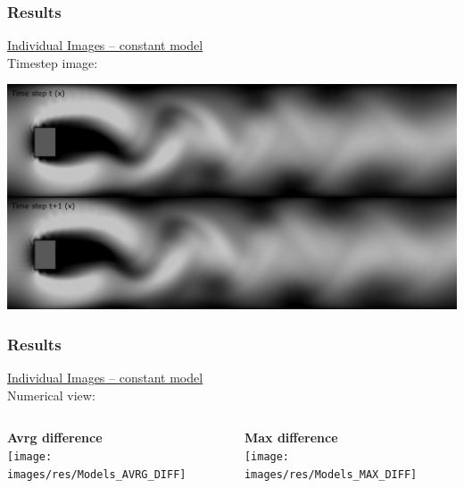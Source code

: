 \documentclass[18pt]{beamer}
\begin{document}
\begin{frame}[t]
  \frametitle{Results}
  \vspace{-1cm}
  \begin{center}
    {\large \underline{Individual Images -- constant model}} \\
    Timestep image:
  \end{center}

  \begin{center}
    \includegraphics[scale=0.32]{images/res/timestep}
  \end{center}  
\end{frame}

\begin{frame}[t]
  \frametitle{Results}
  \vspace{-1cm}
  \begin{center}
    {\large \underline{Individual Images -- constant model}} \\
    Numerical view:
  \end{center}
  \vspace{-0.8cm}
  \begin{columns}[t]
    \begin{column}{0.5\textwidth}
      \begin{center}
        \textbf{Avrg difference} \\
        \texttt{[image: images/res/Models\_AVRG\_DIFF]}
      \end{center}
    \end{column}
    \begin{column}{0.5\textwidth}
      \begin{center}
        \textbf{Max difference} \\
        \texttt{[image: images/res/Models\_MAX\_DIFF]}
      \end{center}
    \end{column}
  \end{columns}
\end{frame}
\end{document}
